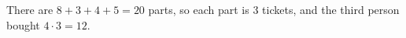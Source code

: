 There are $8+3+4+5=20$ parts, so each part is $3$ tickets, and the third person bought $4\cdot3=\boxed{12}$.
